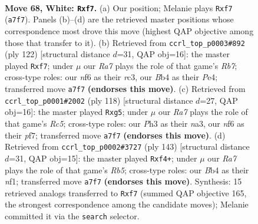 \documentclass[11pt]{article}
\begin{document}
\clearpage

\begin{figure}[p]\centering
\begin{subfigure}{0.46\textwidth}\centering
\resizebox{\linewidth}{!}{%
\newchessgame
\chessboard[
  setfen={7k/R4p2/5n2/3r4/pB3P1p/P3K2P/8/8 w - - 11 68},
  showmover=false,
  pgfstyle=straightmove, color=movearrow, markmove={a7-f7}
]}
\caption{}
\end{subfigure}\hfill
\begin{subfigure}{0.46\textwidth}\centering
\resizebox{\linewidth}{!}{%
\newchessgame
\chessboard[
  setfen={3k4/1R3p2/3p3p/3P3P/2p1PK2/2r5/8/8 w - - 10 62},
  showmover=false,
  pgfstyle=straightmove, color=movearrow, markmove={b7-f7}
]}
\caption{}
\end{subfigure}
\\[4pt]
\begin{subfigure}{0.46\textwidth}\centering
\resizebox{\linewidth}{!}{%
\newchessgame
\chessboard[
  setfen={8/5p2/8/2R3p1/P2Bp3/n3P2k/5r2/3K4 w - - 0 60},
  showmover=false,
  pgfstyle=straightmove, color=movearrow, markmove={c5-g5}
]}
\caption{}
\end{subfigure}\hfill
\begin{subfigure}{0.46\textwidth}\centering
\resizebox{\linewidth}{!}{%
\newchessgame
\chessboard[
  setfen={8/4kp2/6p1/7p/1r3P1P/3R4/5K2/5N2 b - - 0 72},
  showmover=false,
  pgfstyle=straightmove, color=movearrow, markmove={b4-f4}
]}
\caption{}
\end{subfigure}
\caption{\textbf{Move 68, White: \texttt{Rxf7}.} (a) Our position; Melanie plays \texttt{Rxf7} (\texttt{a7f7}). Panels (b)--(d) are the retrieved master positions whose correspondence most drove this move (highest QAP objective among those that transfer to it). (b) Retrieved from \texttt{ccrl\_top\_p0003\#892} (ply 122) [structural distance $d$=31, QAP obj=16]: the master played \texttt{Rxf7}; under $\mu$ our \emph{Ra7} plays the role of that game's \emph{Rb7}; cross-type roles: our \emph{n}f6 as their \emph{r}c3, our \emph{B}b4 as their \emph{P}e4; transferred move \texttt{a7f7} \textbf{(endorses this move)}. (c) Retrieved from \texttt{ccrl\_top\_p0001\#2002} (ply 118) [structural distance $d$=27, QAP obj=16]: the master played \texttt{Rxg5}; under $\mu$ our \emph{Ra7} plays the role of that game's \emph{Rc5}; cross-type roles: our \emph{P}h3 as their \emph{n}a3, our \emph{n}f6 as their \emph{p}f7; transferred move \texttt{a7f7} \textbf{(endorses this move)}. (d) Retrieved from \texttt{ccrl\_top\_p0002\#3727} (ply 143) [structural distance $d$=31, QAP obj=15]: the master played \texttt{Rxf4+}; under $\mu$ our \emph{Ra7} plays the role of that game's \emph{Rb5}; cross-type roles: our \emph{B}b4 as their \emph{n}f1; transferred move \texttt{a7f7} \textbf{(endorses this move)}. Synthesis: 15 retrieved analogs transferred to \texttt{Rxf7} (summed QAP objective 165, the strongest correspondence among the candidate moves); Melanie committed it via the \texttt{search} selector.}
\label{fig:thought-m134}
\end{figure}
\end{document}
